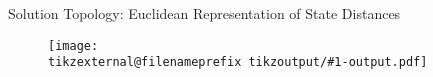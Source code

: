 \documentclass[final, xcolor={svgnames}]{beamer}
\makeatletter
\newif\iftikzex
\newcommand*{\useexternalfile}[1]{%
		\iftikzex
			\tikzsetnextfilename{tikzoutput/#1-output}%
			\scalebox{1}{}
		\else
			\texttt{[image: \\tikzexternal@filenameprefix tikzoutput/\#1-output.pdf]}
		\fi
	}
\newlength{\sepwidth}
\newlength{\colwidth}
\newcommand{\separatorcolumn}{\begin{column}{\sepwidth}\end{column}}
\makeatother
\begin{document}
\begin{frame}[t]
\begin{columns}[t]
\begin{column}{\colwidth}
		\begin{block}{Solution Topology: Euclidean Representation of State Distances}
			\begin{figure}
				\useexternalfile{AAdashpolytope}
				\caption{}
				\label{fig:AAdashpolytope}
			\end{figure}
		\end{block}
	
	\end{column}
	
	\separatorcolumn
\end{columns}
\end{frame}
\end{document}
